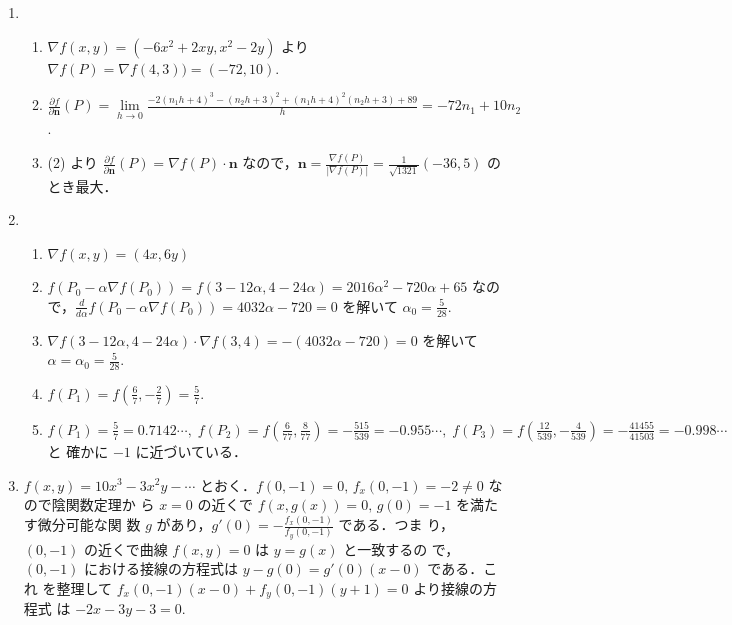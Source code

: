 \documentclass[11pt, uplatex, dvipdfmx, twoside]{jsarticle}
\renewcommand{\dlim}{\lim\limits} %
\begin{document}
\begin{enumerate}[label=\ref{sec:partial}.\arabic*]
  \setlength{\itemsep}{1ex}
  
\item
  \begin{enumerate}[label=(\arabic*)]
    \setlength{\itemsep}{1ex}
    
  \item $\nabla f(x,y) = \left( -6x^2+2xy, x^2-2y\right)$ より
    $\nabla f(P) = \nabla f(4,3))=(-72,10)$.

  \item
    $\frac{\partial f}{\partial \bm{n}}(P)= \dlim_{h \to
      0}\frac{-2(n_1 h + 4)^3 - (n_2 h+3)^2 +
      (n_1h+4)^2(n_2h+3)+89}{h} = -72 n_1 + 10 n_2$.

    
  \item (2) より
    $\frac{\partial f}{\partial \bm{n}}(P) = \nabla f(P) \cdot \bm{n}$
    なので，$\bm{n} = \frac{\nabla f(P)}{ |\nabla f(P)|} =
    \frac{1}{\sqrt{1321}}(-36,5)$ のとき最大．
  \end{enumerate}

\newpage
  
 \item
   \begin{enumerate}[label=(\arabic*)]
     \setlength{\itemsep}{1ex}
     
   \item $\nabla f(x,y) = (4x, 6y)$

   \item
     $f(P_0 - \alpha \nabla f(P_0))=f(3-12\alpha, 4-24\alpha) =
     2016\alpha^2-720\alpha+65$
     なので，$\frac{d}{d\alpha} f(P_0 - \alpha \nabla f(P_0)) =
     4032\alpha-720=0$ を解いて $\alpha_0=\frac{5}{28}$.

   \item
     $\nabla f(3-12\alpha, 4-24\alpha) \cdot \nabla f(3,4) =
     -(4032\alpha-720) =0$ を解いて $\alpha = \alpha_0=\frac{5}{28}$.

   \item $f(P_1) = f\left(\frac{6}{7}, -\frac{2}{7} \right) = \frac{5}{7}$.

   \item
     $ f(P_1) = \frac{5}{7}=0.7142\cdots , \;  f(P_2) = f\left( \frac{6}{77}, \frac{8}{77}\right) =
     -\frac{515}{539}=-0.955\cdots, \; f(P_3) = f\left(\frac{12}{539},
       -\frac{4}{539}\right) = -\frac{41455}{41503} = -0.998\cdots$ と
     確かに $-1$ に近づいている．
   \end{enumerate}

 \item $f(x,y) = 10x^3-3x^2y-\cdots$
   とおく．$f(0,-1) = 0, \, f_x(0,-1) = -2 \neq 0$ なので陰関数定理か
   ら $x=0$ の近くで $f(x, g(x))=0,\, g(0)=-1$ を満たす微分可能な関
   数 $g$ があり，$g'(0) = -\frac{f_x(0,-1)}{f_y(0,-1)}$ である．つま
   り，$(0,-1)$ の近くで曲線 $f(x,y)=0$ は $y=g(x)$ と一致するの
   で，$(0,-1)$ における接線の方程式は $y-g(0)=g'(0)(x-0)$ である．これ
   を整理して $f_x(0,-1)(x-0) + f_y(0,-1)(y+1) =0$ より接線の方程式
   は $-2x-3y-3=0$.


\end{enumerate}
\end{document}

